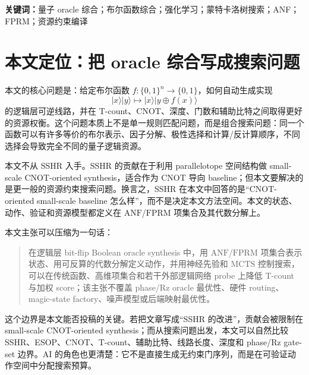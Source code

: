 \documentclass[UTF8,fontset=macnew,11pt]{ctexart}
\newcommand{\anf}{\ensuremath{\mathrm{ANF}}}
\newcommand{\fprm}{\ensuremath{\mathrm{FPRM}}}
\newcommand{\mcts}{\ensuremath{\mathrm{MCTS}}}
\newcommand{\xor}{\ensuremath{\oplus}}
\begin{document}
\noindent\textbf{关键词：}量子 oracle 综合；布尔函数综合；强化学习；蒙特卡洛树搜索；ANF；FPRM；资源约束编译

\section{本文定位：把 oracle 综合写成搜索问题}

本文的核心问题是：给定布尔函数 $f:\{0,1\}^n\rightarrow\{0,1\}$，如何自动生成实现
\begin{equation}
  |x\rangle |y\rangle \mapsto |x\rangle |y\xor f(x)\rangle
  \label{eq:oracle}
\end{equation}
的逻辑层可逆线路，并在 T-count、CNOT、深度、门数和辅助比特之间取得更好的资源权衡。这个问题本质上不是单一规则匹配问题，而是组合搜索问题：同一个函数可以有许多等价的布尔表示、因子分解、极性选择和计算/反计算顺序，不同选择会导致完全不同的量子逻辑资源。

本文不从 SSHR 入手。SSHR 的贡献在于利用 parallelotope 空间结构做 small-scale CNOT-oriented synthesis\cite{zheng2025sshr}，适合作为 CNOT 导向 baseline；但本文要解决的是更一般的资源约束搜索问题。换言之，SSHR 在本文中回答的是“CNOT-oriented small-scale baseline 怎么样”，而不是决定本文方法空间。本文的状态、动作、验证和资源模型都定义在 \anf{}/\fprm{} 项集合及其代数分解上。

本文主张可以压缩为一句话：

\begin{quote}
在逻辑层 bit-flip Boolean oracle synthesis 中，用 \anf{}/\fprm{} 项集合表示状态、用可反算的代数分解定义动作，并用神经先验和 \mcts{} 控制搜索，可以在传统函数、高维项集合和若干外部逻辑网络 probe 上降低 T-count 与加权 score；该主张不覆盖 phase/Rz oracle 最优性、硬件 routing、magic-state factory、噪声模型或后端映射最优性。
\end{quote}

这个边界是本文能否投稿的关键。若把文章写成“SSHR 的改进”，贡献会被限制在 small-scale CNOT-oriented synthesis；而从搜索问题出发，本文可以自然比较 SSHR、ESOP、CNOT、T-count、辅助比特、线路长度、深度和 phase/Rz gate-set 边界。AI 的角色也更清楚：它不是直接生成无约束门序列，而是在可验证动作空间中分配搜索预算。
\end{document}
